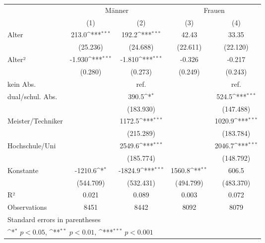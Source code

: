 {
\def\sym#1{\ifmmode^{#1}\else\(^{#1}\)\fi}
\begin{tabular}{l*{4}{c}}
\toprule
            &\multicolumn{2}{c}{Männer}                 &\multicolumn{2}{c}{Frauen}                 \\\cmidrule(lr){2-3}\cmidrule(lr){4-5}
            &\multicolumn{1}{c}{(1)}         &\multicolumn{1}{c}{(2)}         &\multicolumn{1}{c}{(3)}         &\multicolumn{1}{c}{(4)}         \\
\midrule
Alter       &       213.0\sym{***}&       192.2\sym{***}&       42.43         &       33.35         \\
            &    (25.236)         &    (24.688)         &    (22.611)         &    (22.120)         \\
\addlinespace
Alter²      &      -1.930\sym{***}&      -1.810\sym{***}&      -0.326         &      -0.217         \\
            &     (0.280)         &     (0.273)         &     (0.249)         &     (0.243)         \\
\addlinespace
kein Abs.   &                     &        ref.         &                     &        ref.         \\
\addlinespace
dual/schul. Abs.&                     &       390.5\sym{*}  &                     &       524.5\sym{***}\\
            &                     &   (183.930)         &                     &   (147.488)         \\
\addlinespace
Meister/Techniker&                     &      1172.5\sym{***}&                     &      1020.9\sym{***}\\
            &                     &   (215.289)         &                     &   (183.784)         \\
\addlinespace
Hochschule/Uni&                     &      2549.6\sym{***}&                     &      2046.7\sym{***}\\
            &                     &   (185.774)         &                     &   (148.792)         \\
\addlinespace
Konstante   &     -1210.6\sym{*}  &     -1824.9\sym{***}&      1560.8\sym{**} &       606.5         \\
            &   (544.709)         &   (532.431)         &   (494.799)         &   (483.370)         \\
\midrule
R²          &       0.021         &       0.089         &       0.003         &       0.072         \\
Observations&        8451         &        8442         &        8092         &        8079         \\
\bottomrule
\multicolumn{5}{l}{\footnotesize Standard errors in parentheses}\\
\multicolumn{5}{l}{\footnotesize \sym{*} \(p<0.05\), \sym{**} \(p<0.01\), \sym{***} \(p<0.001\)}\\
\end{tabular}
}
